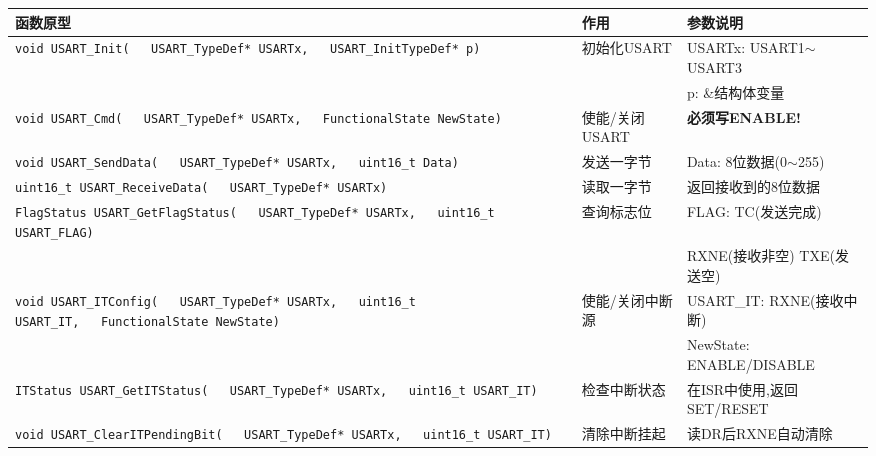 \documentclass[10pt,a4paper,oneside]{ctexart}
\newcommand{\danger}[1]{\textcolor{accent}{\textbf{#1}}}
\begin{document}
\begin{center}
\begin{tabular}{@{}p{5.8cm}p{2cm}p{3.2cm}@{}}
    \toprule
    \textbf{函数原型} & \textbf{作用} & \textbf{参数说明} \\
    \midrule
    \texttt{void USART\_Init(}\newline\texttt{~~~USART\_TypeDef* USARTx,}\newline\texttt{~~~USART\_InitTypeDef* p)} & 初始化USART & USARTx: USART1$\sim$USART3 \\
     &  & p: \&结构体变量 \\
    \midrule
    \texttt{void USART\_Cmd(}\newline\texttt{~~~USART\_TypeDef* USARTx,}\newline\texttt{~~~FunctionalState NewState)} & 使能/关闭USART & \danger{必须写ENABLE!} \\
    \midrule
    \texttt{void USART\_SendData(}\newline\texttt{~~~USART\_TypeDef* USARTx,}\newline\texttt{~~~uint16\_t Data)} & 发送一字节 & Data: 8位数据(0$\sim$255) \\
    \midrule
    \texttt{uint16\_t USART\_ReceiveData(}\newline\texttt{~~~USART\_TypeDef* USARTx)} & 读取一字节 & 返回接收到的8位数据 \\
    \midrule
    \texttt{FlagStatus USART\_GetFlagStatus(}\newline\texttt{~~~USART\_TypeDef* USARTx,}\newline\texttt{~~~uint16\_t USART\_FLAG)} & 查询标志位 & FLAG: TC(发送完成) \\
     &  & RXNE(接收非空) TXE(发送空) \\
    \midrule
    \texttt{void USART\_ITConfig(}\newline\texttt{~~~USART\_TypeDef* USARTx,}\newline\texttt{~~~uint16\_t USART\_IT,}\newline\texttt{~~~FunctionalState NewState)} & 使能/关闭中断源 & USART\_IT: RXNE(接收中断) \\
     &  & NewState: ENABLE/DISABLE \\
    \midrule
    \texttt{ITStatus USART\_GetITStatus(}\newline\texttt{~~~USART\_TypeDef* USARTx,}\newline\texttt{~~~uint16\_t USART\_IT)} & 检查中断状态 & 在ISR中使用,返回SET/RESET \\
    \midrule
    \texttt{void USART\_ClearITPendingBit(}\newline\texttt{~~~USART\_TypeDef* USARTx,}\newline\texttt{~~~uint16\_t USART\_IT)} & 清除中断挂起 & 读DR后RXNE自动清除 \\
    \bottomrule
\end{tabular}
\end{center}
\end{document}
